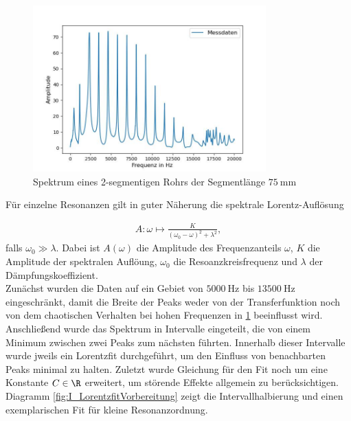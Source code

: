 \documentclass[../main.tex]{subfiles}
\begin{document}
        \begin{figure}[H]
            \centering
            \includegraphics[width=0.8\textwidth]{Bilddateien/Auswertung/I_f_Rohspektrum.jpg}
            \caption{Spektrum eines 2-segmentigen Rohrs der Segmentlänge $\SI{75}{\milli\metre}$}
            \label{fig:I_f_Rohspektrum}
        \end{figure}

        Für einzelne Resonanzen gilt in guter Näherung die spektrale Lorentz-Auflösung 
        
        \begin{align*}
            A: \omega\mapsto \frac{K}{(\omega_0-\omega)^2 + \lambda^2},
        \end{align*}
        falls $\omega_0\gg \lambda$. Dabei ist $A(\omega)$ die Amplitude des Frequenzanteils $\omega$, $K$ die Amplitude der spektralen Auflöung, $\omega_0$ die Resoanzkreisfrequenz und $\lambda$ der Dämpfungskoeffizient.\\

        Zunächst wurden die Daten auf ein Gebiet von $\SI{5000}{\hertz}$ bis $\SI{13500}{\hertz}$ eingeschränkt, damit die Breite der Peaks weder von der Transferfunktion noch von dem chaotischen Verhalten bei hohen Frequenzen in \ref{fig:I_f_Rohspektrum} beeinflusst wird. Anschließend wurde das Spektrum in Intervalle eingeteilt, die von einem Minimum zwischen zwei Peaks zum nächsten führten. Innerhalb dieser Intervalle wurde jweils ein Lorentzfit durchgeführt, um den Einfluss von benachbarten Peaks minimal zu halten. Zuletzt wurde Gleichung für den Fit noch um eine Konstante $C\in\R$ erweitert, um störende Effekte allgemein zu berücksichtigen. Diagramm \ref{fig:I_LorentzfitVorbereitung} zeigt die Intervallhalbierung und einen exemplarischen Fit für kleine Resonanzordnung.
\end{document}
